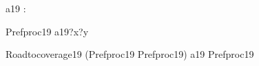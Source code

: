 \begin{circus}
\circchannel a19 : \nat \cross \nat \\
\end {circus}
\begin {circus}
\circprocess Prefproc19 \circdef \circbegin
	\circspot
	    a19?x?y \then \Skip \\
	\circend
\end{circus}
\begin{circus}
\circprocess Roadtocoverage19 \circdef (Prefproc19 \interleave Prefproc19) \lpar \lchanset a19 \rchanset \rpar Prefproc19 \\
\end{circus}
